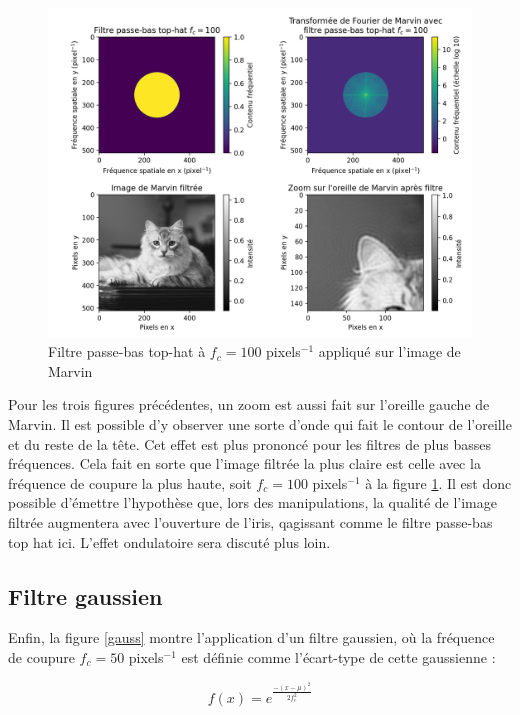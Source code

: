 \documentclass[11pt,letterpaper]{article}
\begin{document}
\begin{figure}[H]
  \centering
  \includegraphics[scale=0.7]{marvin_post_filter_fc_100.png}
  \caption{Filtre passe-bas top-hat à $f_c = 100$ pixels$^{-1}$ appliqué sur l'image de Marvin}
  \label{fc100}
\end{figure}

Pour les trois figures précédentes, un zoom est aussi fait sur l'oreille gauche de Marvin. Il est possible d'y observer une sorte d'onde qui fait le contour de l'oreille et du reste de la tête. Cet effet est plus prononcé pour les filtres de plus basses fréquences. Cela fait en sorte que l'image filtrée la plus claire est celle avec la fréquence de coupure la plus haute, soit $f_c=100$ pixels$^{-1}$ à la figure \ref{fc100}. Il est donc possible d'émettre l'hypothèse que, lors des manipulations, la qualité de l'image filtrée augmentera avec l'ouverture de l'iris, qagissant comme le filtre passe-bas top hat ici. L'effet ondulatoire sera discuté plus loin.

\subsection{Filtre gaussien}

Enfin, la figure \ref{gauss} montre l'application d'un filtre gaussien, où la fréquence de coupure $f_c = 50$ pixels$^{-1}$ est définie comme l'écart-type de cette gaussienne :

\begin{equation}
  f(x) = e^{\frac{-\left( x-\mu \right)^{2}}{2f_c^2}}
\end{equation}
\end{document}
